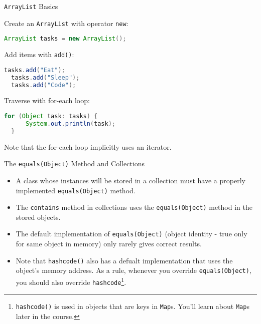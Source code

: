 \documentclass{beamer}
\begin{document}
\begin{frame}[fragile]{{\tt ArrayList} Basics}


Create an {\tt ArrayList} with operator {\tt new}:
\begin{lstlisting}[language=Java]
  ArrayList tasks = new ArrayList();
\end{lstlisting}
Add items with {\tt add()}:
\begin{lstlisting}[language=Java]
  tasks.add("Eat");
  tasks.add("Sleep");
  tasks.add("Code");
\end{lstlisting}
Traverse with for-each loop:
\begin{lstlisting}[language=Java]
  for (Object task: tasks) {
      System.out.println(task);
  }
\end{lstlisting}

Note that the for-each loop implicitly uses an iterator.

\end{frame}

\begin{frame}[fragile]{The {\tt equals(Object)} Method and Collections}



\begin{itemize}
\item A class whose instances will be stored in a collection must have a properly implemented {\tt equals(Object)} method.
\item The {\tt contains} method in collections uses the {\tt equals(Object)} method in the stored objects.
\item The default implementation of {\tt equals(Object)} (object identity - true only for same object in memory) only rarely gives correct results.
\item Note that {\tt hashcode()} also has a defualt implementation that uses the object's memory address.  As a rule, whenever you override {\tt equals(Object)}, you should also override {\tt hashcode}\footnote{{\tt hashcode()} is used in objects that are keys in {\tt Map}s.  You'll learn about {\tt Map}s later in the course.}.
\end{itemize}


\end{frame}
\end{document}
